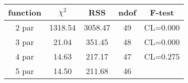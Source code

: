 \begin{tabular}{c|c|c|c|c}
function & $\chi^2$ & RSS & ndof & F-test \\
\hline
2 par & 1318.54 & 3058.47 & 49 & CL=0.000 \\
3 par & 21.04 & 351.45 & 48 & CL=0.000 \\
4 par & 14.63 & 217.17 & 47 & CL=0.275 \\
5 par & 14.50 & 211.68 & 46 & \\
\hline
\end{tabular}